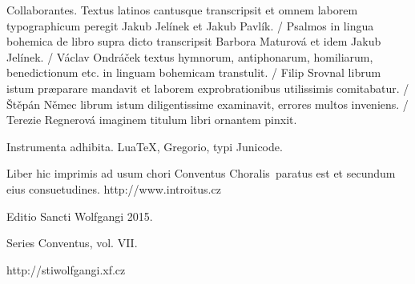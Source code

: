 \documentclass[a4paper, twoside, 12pt]{article}
\newcommand{\annusEditionis}{2015}
\begin{document}
Collaborantes.
Textus latinos cantusque transcripsit et omnem laborem typographicum peregit
Jakub Jelínek et Jakub Pavlík. /
Psalmos in lingua bohemica de libro supra dicto transcripsit
Barbora Maturová et idem Jakub Jelínek. /
Václav Ondráček textus hymnorum, antiphonarum, homiliarum, benedictionum etc.
in linguam bohemicam transtulit. /
Filip Srovnal librum istum præparare mandavit et laborem exprobrationibus
utilissimis comitabatur. /
Štěpán Němec librum istum diligentissime examinavit, errores multos
inveniens. /
Terezie Regnerová imaginem titulum libri ornantem pinxit.

Instrumenta adhibita.
LuaTeX, %
Gregorio, %
typi Junicode. %

\begin{center}
Liber hic imprimis ad usum chori
\guillemotright Conventus Choralis\guillemotleft\
paratus est
et secundum eius consuetudines.
http://www.introitus.cz

\vfill

{\large Editio Sancti Wolfgangi \annusEditionis.}

\vfill

Series \guillemotright Conventus\guillemotleft, vol. VII.

\vfill

http://stiwolfgangi.xf.cz

\end{center}

\vfill
\end{document}

